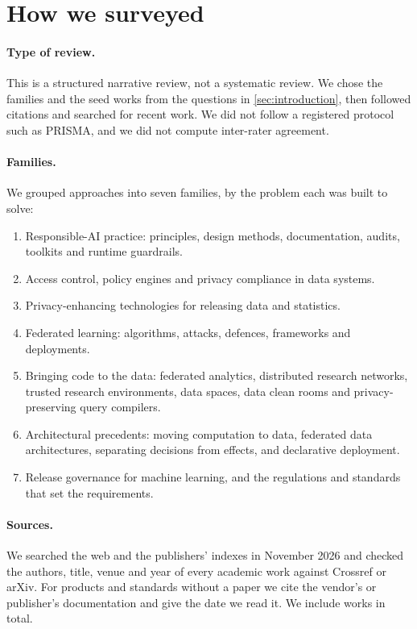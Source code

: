 \section{How we surveyed}
\label{sec:method}

\paragraph{Type of review.} This is a structured narrative review, not a
systematic review. We chose the families and the seed works from the
questions in \cref{sec:introduction}, then followed citations and searched for
recent work. We did not follow a registered protocol such as PRISMA, and we did
not compute inter-rater agreement.

\paragraph{Families.} We grouped approaches into seven families, by the problem
each was built to solve:
\begin{enumerate}[label=F\arabic*.]
  \item Responsible-AI practice: principles, design methods, documentation,
        audits, toolkits and runtime guardrails.
  \item Access control, policy engines and privacy compliance in data systems.
  \item Privacy-enhancing technologies for releasing data and statistics.
  \item Federated learning: algorithms, attacks, defences, frameworks and
        deployments.
  \item Bringing code to the data: federated analytics, distributed research
        networks, trusted research environments, data spaces, data clean rooms
        and privacy-preserving query compilers.
  \item Architectural precedents: moving computation to data, federated data
        architectures, separating decisions from effects, and declarative
        deployment.
  \item Release governance for machine learning, and the regulations and
        standards that set the requirements.
\end{enumerate}

\paragraph{Sources.} We searched the web and the publishers' indexes in
November 2026 and checked the authors, title, venue and year of every academic
work against Crossref or arXiv. For products and standards without a paper we
cite the vendor's or publisher's documentation and give the date we read it.
We include \SurveyWorks{} works in total.


